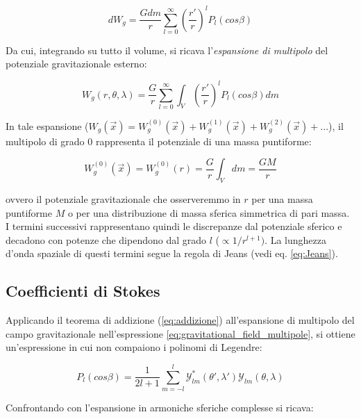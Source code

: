 \documentclass[a4paper,12pt]{book}
\begin{document}
\begin{equation}
    dW_g = \frac{Gdm}{r} \sum_{l=0}^\infty \left( \frac{r'}{r} \right)^l P_l(cos\beta)
\end{equation}

\noindent Da cui, integrando su tutto il volume, si ricava l'\textit{espansione di multipolo} del potenziale gravitazionale esterno:

\begin{equation}
    W_g (r, \theta, \lambda) = \frac{G}{r} \sum_{l=0}^\infty \int_V \left( \frac{r'}{r} \right)^l P_l(cos\beta) dm
    \label{eq:gravitational_field_multipole}
\end{equation}

\noindent In tale espansione ($W_g (\vec{x}) = W_g^{(0)} (\vec{x}) + W_g^{(1)} (\vec{x}) + W_g^{(2)} (\vec{x}) + ...$), il multipolo di grado 0 rappresenta il potenziale di una massa puntiforme:

\begin{equation}
    W_g^{(0)}(\vec{x}) = W_g^{(0)}(r) = \frac{G}{r} \int_V dm = \frac{GM}{r}
\end{equation}

\noindent
ovvero il potenziale gravitazionale che osserveremmo in $r$ per una massa puntiforme $M$ o per una distribuzione di massa sferica simmetrica di pari massa.\\

I termini successivi rappresentano quindi le discrepanze dal potenziale sferico e decadono con potenze che dipendono dal grado $l$ ($\propto 1/r^{l+1})$.
La lunghezza d'onda spaziale di questi termini segue la regola di Jeans (vedi eq. \ref{eq:Jeans}).

\subsection{\textcolor{colore7}{Coefficienti di Stokes}}

Applicando il teorema di addizione (\ref{eq:addizione}) all'espansione di multipolo del campo gravitazionale nell'espressione \ref{eq:gravitational_field_multipole}, si ottiene un'espressione in cui non compaiono i polinomi di Legendre:

\begin{equation}
    P_l(cos\beta) = \frac{1}{2l+1} \sum_{m=-l}^l \mathcal{Y}^*_{lm} (\theta', \lambda') \mathcal{Y}_{lm}(\theta, \lambda)
\end{equation}

\noindent Confrontando con l'espansione in armoniche sferiche complesse si ricava:
\end{document}
